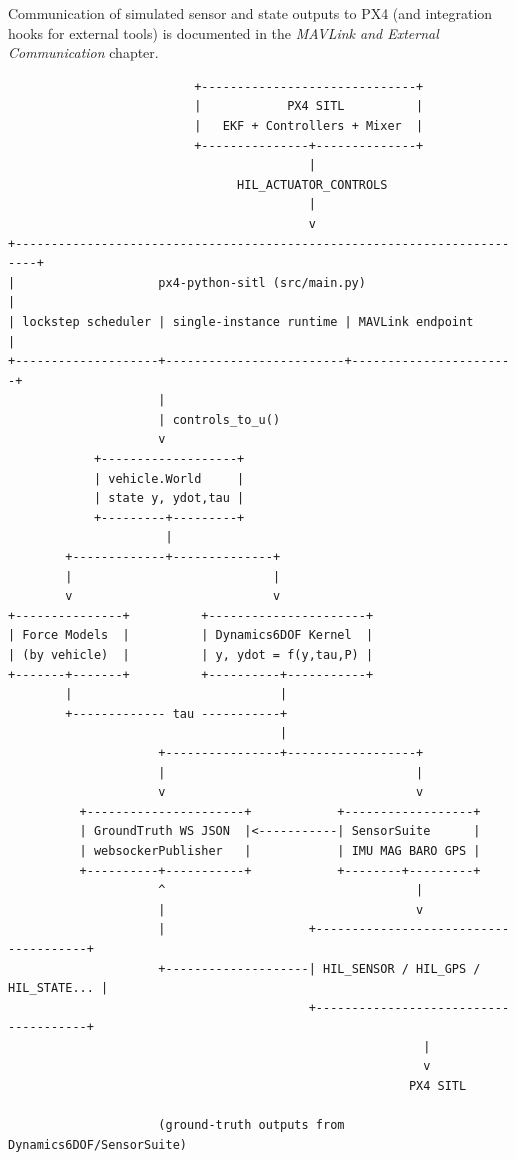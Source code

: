 \documentclass[11pt,a4paper]{article}
\begin{document}
Communication of simulated sensor and state outputs to PX4 (and integration hooks for external tools) is documented in the \textit{MAVLink and External Communication} chapter.

\begin{verbatim}
                          +------------------------------+
                          |            PX4 SITL          |
                          |   EKF + Controllers + Mixer  |
                          +---------------+--------------+
                                          |
                                HIL_ACTUATOR_CONTROLS
                                          |
                                          v
+-------------------------------------------------------------------------+
|                    px4-python-sitl (src/main.py)                        |
| lockstep scheduler | single-instance runtime | MAVLink endpoint      |
+--------------------+-------------------------+-----------------------+
                     |
                     | controls_to_u()
                     v
            +-------------------+
            | vehicle.World     |
            | state y, ydot,tau |
            +---------+---------+
                      |
        +-------------+--------------+
        |                            |
        v                            v
+---------------+          +----------------------+
| Force Models  |          | Dynamics6DOF Kernel  |
| (by vehicle)  |          | y, ydot = f(y,tau,P) |
+-------+-------+          +----------+-----------+
        |                             |
        +------------- tau -----------+
                                      |
                     +----------------+------------------+
                     |                                   |
                     v                                   v
          +----------------------+            +------------------+
          | GroundTruth WS JSON  |<-----------| SensorSuite      |
          | websockerPublisher   |            | IMU MAG BARO GPS |
          +----------+-----------+            +--------+---------+
                     ^                                   |
                     |                                   v
                     |                    +--------------------------------------+
                     +--------------------| HIL_SENSOR / HIL_GPS / HIL_STATE... |
                                          +--------------------------------------+
                                                          |
                                                          v
                                                        PX4 SITL

                     (ground-truth outputs from Dynamics6DOF/SensorSuite)
\end{verbatim}
\end{document}
